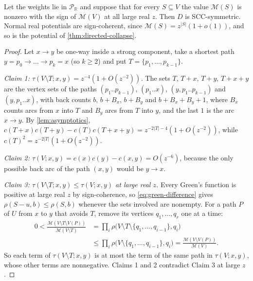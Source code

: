 \documentclass[final]{siamart0516}
\numberwithin{theorem}{section}
\numberwithin{equation}{section}
\theoremstyle{siamnonum}
\theoremstyle{plain}
\newcommand{\RR}{\mathbb{R}}
\newcommand{\Puis}{\mathcal{P}_{\RR}}
\newcommand{\Mpot}{\mathcal{M}}           %
\begin{document}
\begin{corollary}\label{cor:sign-coherent}
Let the weights lie in $\Puis$ and suppose that for every $S\subseteq V$ the value $\Mpot(S)$ is nonzero with the sign of $\Mpot(V)$ at all large real $z$. Then $D$ is SCC-symmetric. Normal real potentials are sign-coherent, since $\Mpot(S)=z^{|S|}(1+o(1))$, and so is the potential of \cref{thm:directed-collapse}.
\end{corollary}
\begin{proof}
Let $x\to y$ be one-way inside a strong component, take a shortest path $y=p_0\to\dots\to p_k=x$ (so $k\ge2$) and put $T=\{p_1,\dots,p_{k-1}\}$.

\emph{Claim 1: $\tau(V\setminus T;x,y)=z^{-4}(1+O(z^{-2}))$.} The sets $T$, $T+x$, $T+y$, $T+x+y$ are the vertex sets of the paths $(p_1..p_{k-1})$, $(p_1..x)$, $(y,p_1..p_{k-1})$ and $(y,p_1..x)$, with back counts $b$, $b+B_x$, $b+B_y$ and $b+B_x+B_y+1$, where $B_x$ counts arcs from $x$ into $T$ and $B_y$ arcs from $T$ into $y$, and the last $1$ is the arc $x\to y$. By \cref{lem:asymptotics}, $c(T{+}x)c(T{+}y)-c(T)c(T{+}x{+}y)=z^{-2|T|-4}(1+O(z^{-2}))$, while $c(T)^2=z^{-2|T|}(1+O(z^{-2}))$.

\emph{Claim 2: $\tau(V;x,y)=c(x)c(y)-c(x,y)=O(z^{-6})$}, because the only possible back arc of the path $(x,y)$ would be $y\to x$.

\emph{Claim 3: $\tau(V\setminus T;x,y)\le\tau(V;x,y)$ at large real $z$.} Every Green's function is positive at large real $z$ by sign-coherence, so \eqref{eq:green-difference} gives $\rho(S-u,b)\le\rho(S,b)$ whenever the sets involved are nonempty. For a path $P$ of $U$ from $x$ to $y$ that avoids $T$, remove its vertices $q_1,\dots,q_r$ one at a time:
\begin{align*}
0<\frac{\Mpot(V\setminus T\setminus V(P))}{\Mpot(V\setminus T)}&=\prod_i\rho\bigl(V\setminus T\setminus\{q_1,\dots,q_{i-1}\},q_i\bigr)\\
&\le\prod_i\rho\bigl(V\setminus\{q_1,\dots,q_{i-1}\},q_i\bigr)=\frac{\Mpot(V\setminus V(P))}{\Mpot(V)}.
\end{align*}
So each term of $\tau(V\setminus T;x,y)$ is at most the term of the same path in $\tau(V;x,y)$, whose other terms are nonnegative. Claims 1 and 2 contradict Claim 3 at large $z$.
\end{proof}
\end{document}
